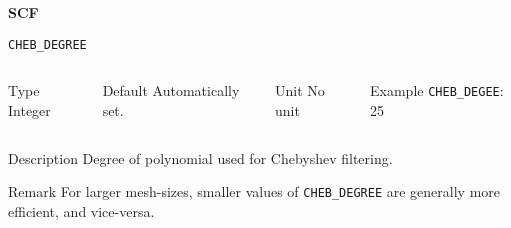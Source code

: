 
\begin{frame}[allowframebreaks,c]{} \label{SCF}

\begin{center}
\Huge \textbf{SCF}
\end{center}

\end{frame}


\begin{frame}[allowframebreaks]{\texttt{CHEB\_DEGREE}} \label{CHEB_DEGREE}
\vspace*{-12pt}
\begin{columns}
\begin{block}{Type}
Integer
\end{block}

\begin{block}{Default}
Automatically set.
\end{block}

\begin{block}{Unit}
No unit
\end{block}

\begin{block}{Example}
\texttt{CHEB\_DEGEE}: 25
\end{block}
\end{columns}

\begin{block}{Description}
Degree of polynomial used for Chebyshev filtering. 
\end{block}

\begin{block}{Remark}
For larger mesh-sizes, smaller values of \texttt{CHEB\_DEGREE} are generally more efficient, and vice-versa.
\end{block}

\end{frame}


